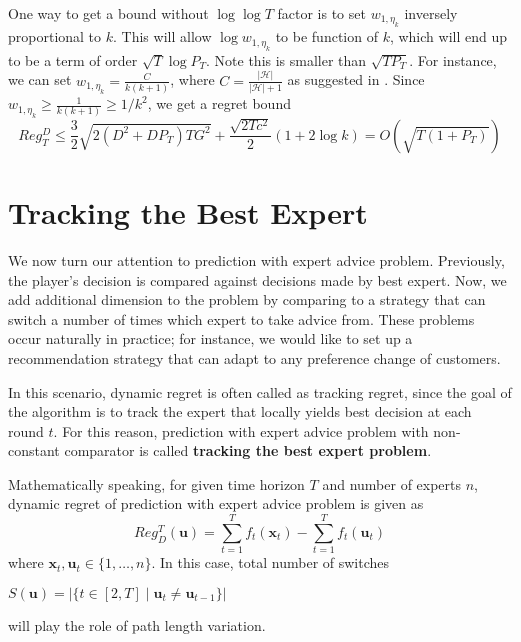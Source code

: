 \documentclass[12pt, a4paper]{report}
\begin{document}
One way to get a bound without $\log \log T$ factor is to set $w_{1, \eta_k}$ inversely proportional to $k$. This will allow $\log w_{1, \eta_k}$ to be function of $k$, which will end up to be a term of order $\sqrt{T}\log P_T$. Note this is smaller than $\sqrt{T P_T}$. For instance, we can set $w_{1, \eta_k} = \frac{C}{k(k+1)}$, where $C = \frac{|\mathcal{H}|}{|\mathcal{H}|+1}$ as suggested in \cite{Zhang2018AdaptiveOL}. Since $w_{1, \eta_k} \geq \frac{1}{k(k+1)} \geq 1/k^2$, we get a regret bound
\begin{equation*}
    Reg_T^D \leq \frac{3}{2}\sqrt{2(D^2 + DP_T)TG^2} + \frac{\sqrt{2Tc^2}}{2}(1 + 2 \log k) = O(\sqrt{T(1 + P_T)})
\end{equation*}


\section{Tracking the Best Expert}
We now turn our attention to prediction with expert advice problem. Previously, the player's decision is compared against decisions made by best expert. Now, we add additional dimension to the problem by comparing to a strategy that can switch a number of times which expert to take advice from. These problems occur naturally in practice; for instance, we would like to set up a recommendation strategy that can adapt to any preference change of customers. 

In this scenario, dynamic regret is often called as tracking regret, since the goal of the algorithm is to track the expert that locally yields best decision at each round $t$. For this reason, prediction with expert advice problem with non-constant comparator is called \textbf{tracking the best expert problem}. 

Mathematically speaking, for given time horizon $T$ and number of experts $n$, dynamic regret of prediction with expert advice problem is given as
\begin{equation*}
    Reg_D^T(\mathbf{u}) = \sum_{t=1}^T f_t(\mathbf{x}_t) - \sum_{t=1}^T f_t(\mathbf{u}_t)
\end{equation*}
where $\mathbf{x}_t, \mathbf{u}_t \in \{1, \dots, n\}$. In this case, total number of switches
\begin{center}
    $S(\mathbf{u}) = |\{t \in [2, T] \mid \mathbf{u}_t \neq \mathbf{u}_{t-1}\}|$
\end{center} 
will play the role of path length variation.  
\end{document}
